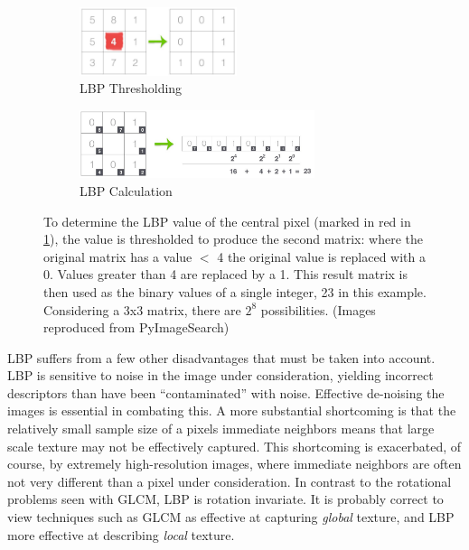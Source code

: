 \documentclass[letterpaper]{article}
\begin{document}
{\begin{figure}[H]
	\begin{subfigure}[h]{0.48\linewidth}
		\centering
		\includegraphics[height=2cm]{./figures/lbp_thresholding.jpg}
		\caption{LBP Thresholding}
		\label{subfig:lbp-thresholding}	
	\end{subfigure}
	\hfill
	\begin{subfigure}[h]{0.48\linewidth}
		\centering
		\includegraphics[height=2cm]{./figures/lbp_calculation.jpg}
		\caption{LBP Calculation}
		\label{subfig:lbp-calculation}		
	\end{subfigure}%
	\caption[Local Binary Pattern thresholding and calculation]{To determine the LBP value of the central pixel (marked in red in \ref{subfig:lbp-thresholding}), the value is thresholded to produce the second matrix: where the original matrix has a value $<$ 4 the original value is replaced with a 0. Values greater than 4 are replaced by a 1. This result matrix is then used as the binary values of a single integer, 23 in this example. Considering a 3x3 matrix, there are $2^8$ possibilities. (Images reproduced from PyImageSearch)}
	\label{fig:lbp}
\end{figure}



LBP suffers from a few other disadvantages that must be taken into account. LBP is sensitive to noise in the image under consideration, yielding incorrect descriptors than have been ``contaminated'' with noise. Effective de-noising the images is essential in combating this. A more substantial shortcoming is that the relatively small sample size of a pixels immediate neighbors means that large scale texture may not be effectively captured. This shortcoming is exacerbated, of course, by extremely high-resolution images, where immediate neighbors are often not very different than a pixel under consideration. In contrast to the rotational problems seen with GLCM, LBP is rotation invariate. It is probably correct to view techniques such as GLCM as effective at capturing \textit{global} texture, and LBP more effective at describing \textit{local} texture.

}
\end{document}
